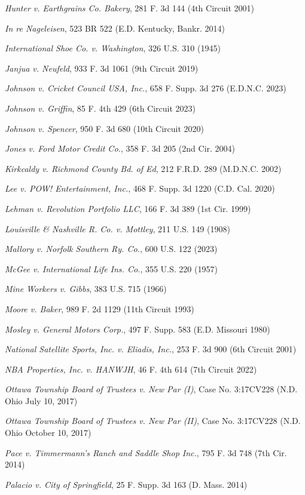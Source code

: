 \textit{Hunter v. Earthgrains Co. Bakery}, 281 F. 3d 144 (4th Circuit 2001)

\textit{In re Nageleisen}, 523 BR 522 (E.D. Kentucky, Bankr. 2014)

\textit{International Shoe Co. v. Washington}, 326 U.S. 310 (1945)

\textit{Janjua v. Neufeld}, 933 F. 3d 1061 (9th Circuit 2019)

\textit{Johnson v. Cricket Council USA, Inc.}, 658 F. Supp. 3d 276 (E.D.N.C. 2023)

\textit{Johnson v. Griffin}, 85 F. 4th 429 (6th Circuit 2023)

\textit{Johnson v. Spencer}, 950 F. 3d 680 (10th Circuit 2020)

\textit{Jones v. Ford Motor Credit Co.}, 358 F. 3d 205 (2nd Cir. 2004)

\textit{Kirkcaldy v. Richmond County Bd. of Ed}, 212 F.R.D. 289 (M.D.N.C. 2002)

\textit{Lee v. POW! Entertainment, Inc.}, 468 F. Supp. 3d 1220 (C.D. Cal. 2020)

\textit{Lehman v. Revolution Portfolio LLC}, 166 F. 3d 389 (1st Cir. 1999)

\textit{Louisville \& Nashville R. Co. v. Mottley}, 211 U.S. 149 (1908)

\textit{Mallory v. Norfolk Southern Ry. Co.}, 600 U.S. 122 (2023)

\textit{McGee v. International Life Ins. Co.}, 355 U.S. 220 (1957)

\textit{Mine Workers v. Gibbs}, 383 U.S. 715 (1966)

\textit{Moore v. Baker}, 989 F. 2d 1129 (11th Circuit 1993)

\textit{Mosley v. General Motors Corp.}, 497 F. Supp. 583 (E.D. Missouri 1980)

\textit{National Satellite Sports, Inc. v. Eliadis, Inc.}, 253 F. 3d 900 (6th Circuit 2001)

\textit{NBA Properties, Inc. v. HANWJH}, 46 F. 4th 614 (7th Circuit 2022)

\textit{Ottawa Township Board of Trustees v. New Par (I)}, Case No. 3:17CV228 (N.D. Ohio July 10, 2017)

\textit{Ottawa Township Board of Trustees v. New Par (II)}, Case No. 3:17CV228 (N.D. Ohio October 10, 2017)

\textit{Pace v. Timmermann’s Ranch and Saddle Shop Inc.}, 795 F. 3d 748 (7th Cir. 2014)

\textit{Palacio v. City of Springfield}, 25 F. Supp. 3d 163 (D. Mass. 2014)

